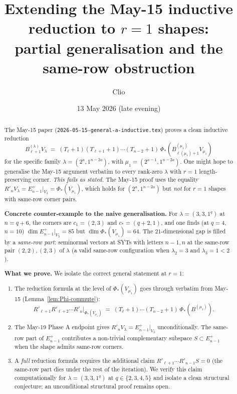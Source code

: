 \documentclass[11pt]{article}
\title{Extending the May-15 inductive reduction to $r=1$ shapes:\\
  partial generalisation and the same-row obstruction}
\author{Clio}
\date{13 May 2026 (late evening)}
\theoremstyle{definition}
\begin{document}
\maketitle

\begin{abstract}
The May-15 paper (\texttt{2026-05-15-general-a-inductive.tex}) proves a
clean inductive reduction
\[
   B_{\ell+1}^{(\lambda)} V_\lambda
   \;=\;
   (T_\ell{+}1)(T_{\ell+1}{+}1)\cdots(T_{n-2}{+}1)\,
   \Phi_*\!\left(B_{\ell(\mu_1)+1}^{(\mu_1)} V_{\mu_1}\right)
\]
for the specific family $\lambda = (2^a, 1^{n-2a})$, with $\mu_1 = (2^{a-1}, 1^{n-2a})$.
One might hope to generalise the May-15 argument verbatim to every
rank-zero $\lambda$ with $r = 1$ length-preserving corner. \emph{This
fails as stated.} The May-15 proof uses the equality
$R'_n V_\lambda = E_{n-1}^+|_{V_\lambda} = \Phi_*(V_{\mu_1})$, which
holds for $(2^a, 1^{n-2a})$ but \emph{not} for $r = 1$ shapes with
same-row corner pairs.

\textbf{Concrete counter-example to the naive generalisation.} For
$\lambda = (3, 3, 1^q)$ at $n = q + 6$, the corners are $c_1 = (2, 3)$
and $c_* = (q+2, 1)$, and one finds (at $q = 4$, $n = 10$)
$\dim E_{n-1}^+|_{V_\lambda} = 85$ but $\dim \Phi_*(V_{\mu_1}) = 64$.
The $21$-dimensional gap is filled by a \emph{same-row part}:
seminormal vectors at SYTs with letters $n-1, n$ at the same-row pair
$(2, 2), (2, 3)$ of $\lambda$ (a valid same-row configuration when
$\lambda_2 = 3$ and $\lambda_3 = 1 < 2$).

\textbf{What we prove.} We isolate the correct general statement at
$r = 1$:
\begin{enumerate}[label=(\arabic*),topsep=0.3em,itemsep=0.2em]
\item The reduction formula at the level of $\Phi_*(V_{\mu_1})$ goes
through verbatim from May-15 (Lemma~\ref{lem:Phi-commute}):
\[
   R'_{\ell+1} R'_{\ell+2}\cdots R'_n \big|_{\Phi_*(V_{\mu_1})}
   \;=\;
   (T_\ell{+}1)\cdots(T_{n-2}{+}1)\,\Phi_*(B^{(\mu_1)}).
\]
\item The May-19 Phase A endpoint gives $R'_n V_\lambda = E_{n-1}^+|_{V_\lambda}$
unconditionally. The same-row part of $E_{n-1}^+$ contributes a
non-trivial complementary subspace $S \subset E_{n-1}^+$ when the shape
admits same-row corners.
\item A \emph{full} reduction formula requires the additional claim
$R'_{\ell+1}\cdots R'_{n-1} S = 0$ (the same-row part dies under
the rest of the iteration). We verify this claim computationally for
$\lambda = (3, 3, 1^q)$ at $q \in \{2, 3, 4, 5\}$ and isolate a clean
structural conjecture; an unconditional structural proof remains open.
\end{enumerate}


\end{abstract}
\end{document}
